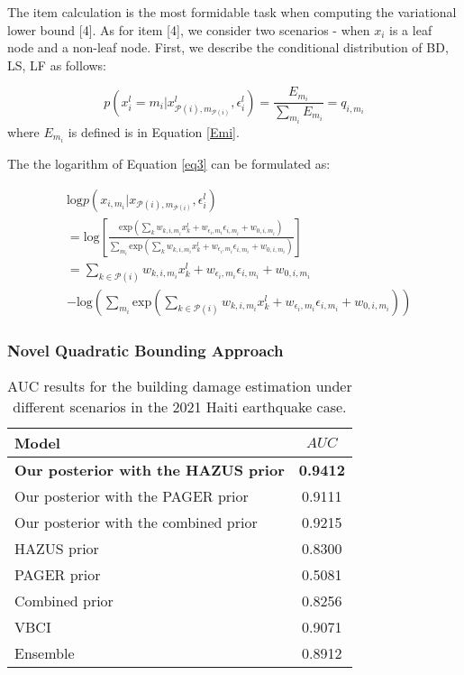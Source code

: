 \documentclass[review]{elsarticle}
\begin{document}
The item calculation is the most formidable task when computing the variational lower bound [4]. As for item [4], we consider two scenarios - when $x_{i}$ is a leaf node and a non-leaf node. First, we describe the conditional distribution of BD, LS, LF as follows:


\begin{equation}\label{eq3}
p(x_{i}^l=m_{i}|x_{\mathcal{P}(i), m_{\mathcal{P}(i)}}^{l}, \epsilon_{i}^l) = \frac{E_{m_{i}}}{\sum_{m_{i}} E_{m_{i}}} = q_{i,m_{i}}
\end{equation}
\noindent where $E_{m_{i}}$ is defined is in Equation \ref{Emi}. 

The the logarithm of Equation \ref{eq3} can be formulated as: 

\begin{equation}\label{eq4}
\begin{aligned}
& \text{log}p(x_{i, m_{i}}|x_{\mathcal{P}(i), m_{\mathcal{P}(i)}}, \epsilon_{i}^l) \\
& = \text{log}[\frac{\text{exp}(\sum_{k}w_{k, i, m_{i}}x_{k}^l + w_{\epsilon_{i}, m_{i}}\epsilon_{i, m_{i}} + w_{0,i, m_{i}})}{\sum_{m_{i}} \text{exp}(\sum_{k}w_{k, i, m_{i}}x_{k}^l + w_{\epsilon_{i}, m_{i}}\epsilon_{i, m_{i}} + w_{0,i, m_{i}})}] \\
& = \sum_{k \in {\mathcal{P}(i)}}w_{k, i, m_{i}}x_{k}^l + w_{\epsilon_{i}, m_{i}}\epsilon_{i, m_{i}} + w_{0,i, m_{i}} \\
& - \text{log}(\sum_{m_{i}} \text{exp}(\sum_{k \in {\mathcal{P}(i)}}w_{k, i, m_{i}}x_{k}^l + w_{\epsilon_{i}, m_{i}}\epsilon_{i, m_{i}} + w_{0,i, m_{i}}))
\end{aligned}
\end{equation}




\subsubsection{Novel Quadratic Bounding Approach}

\begin{table}[t]
 \centering
 \caption{AUC results for the  building damage estimation under different scenarios in the 2021 Haiti earthquake case.}
 \begin{tabular}{l c}
\toprule
Model  & $AUC$  \\
\toprule
\textbf{Our posterior with the HAZUS prior} & \textbf{0.9412}\\
Our posterior with the PAGER prior & 0.9111\\
Our posterior with the combined prior & 0.9215\\
HAZUS prior & 0.8300\\
PAGER prior & 0.5081\\
Combined prior & 0.8256\\
VBCI \cite{xu2022seismic} & 0.9071\\
Ensemble \cite{rao2023earthquake} & 0.8912\\
 \bottomrule
 \end{tabular}
 \label{Haiti_BD}
 \end{table}
\end{document}
